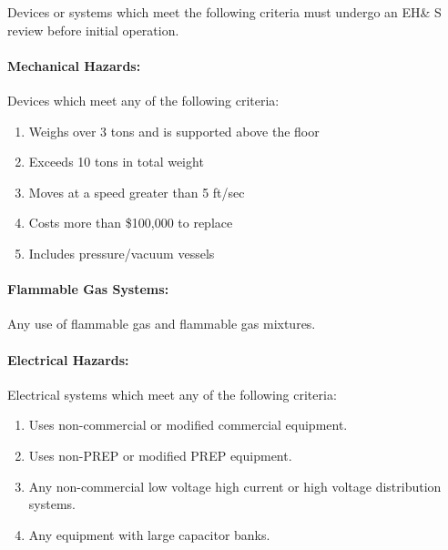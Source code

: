 %
%
\noindent Devices or systems which meet the following criteria must undergo an EH\& S review 
before initial operation.

\paragraph{Mechanical Hazards:} Devices which meet any of the following criteria:

\begin{enumerate}
\item Weighs over 3 tons and is supported above the floor

\item Exceeds 10 tons in total weight

\item Moves at a speed greater than 5 ft/sec

\item Costs more than \$100,000 to replace

\item Includes pressure/vacuum vessels
\end{enumerate}

\paragraph {Flammable Gas Systems:}  

Any use of flammable gas and flammable gas mixtures.

\paragraph {Electrical Hazards:}  

Electrical systems which meet any of the following criteria:

\begin{enumerate}

\item Uses non-commercial or modified commercial equipment.

\item Uses non-PREP or modified PREP equipment.

\item Any non-commercial low voltage high current or high voltage distribution
systems.

\item Any equipment with large capacitor banks.

\end{enumerate}

